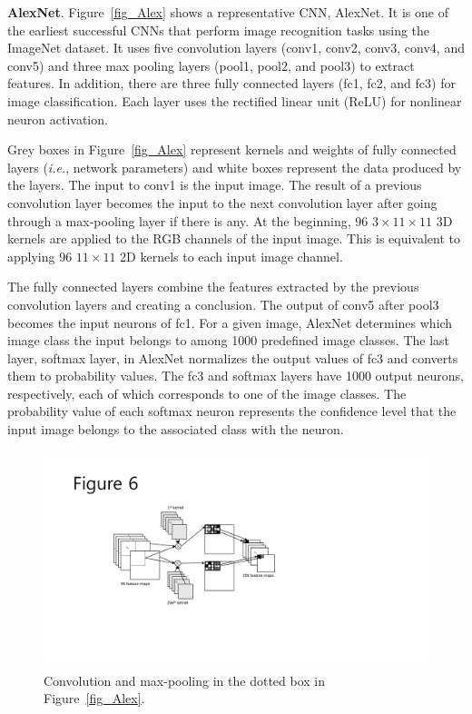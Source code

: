 {\bf AlexNet}. Figure~\ref{fig_Alex} shows a representative CNN, AlexNet\cite{krizhevsky2012imagenet}. It is one of the earliest successful CNNs that perform image recognition tasks using the ImageNet dataset\cite{DBLP:journals/corr/RussakovskyDSKSMHKKBBF14}. It uses five convolution layers (\textsf{conv1}, \textsf{conv2}, \textsf{conv3}, \textsf{conv4}, and \textsf{conv5}) and three max pooling layers (\textsf{pool1}, \textsf{pool2}, and \textsf{pool3}) to extract features. In addition, there are three fully connected layers (\textsf{fc1}, \textsf{fc2}, and \textsf{fc3}) for image classification. Each layer uses the rectified linear unit (ReLU) for nonlinear neuron activation. 

Grey boxes in Figure~\ref{fig_Alex} represent kernels and weights of fully connected layers (\textit{i.e.}, network parameters) and white boxes represent the data produced by the layers. The input to \textsf{conv1} is the input image. The result of a previous convolution layer becomes the input to the next convolution layer after going through a max-pooling layer if there is any. At the beginning, 96 $3 \times 11 \times 11$ 3D kernels are applied to the RGB channels of the input image. This is equivalent to applying 96 $11 \times 11$ 2D kernels to each input image channel. 

The fully connected layers combine the features extracted by the previous convolution layers and creating a conclusion. The output of \textsf{conv5} after \textsf{pool3} becomes the input neurons of \textsf{fc1}. For a given image, AlexNet determines which image class the input belongs to among 1000 predefined image classes. The last layer, \textsf{softmax} layer, in AlexNet normalizes the output values of \textsf{fc3} and converts them to probability values. The \textsf{fc3} and \textsf{softmax} layers have 1000 output neurons, respectively, each of which corresponds to one of the image classes. The probability value of each \textsf{softmax} neuron represents the confidence level that the input image belongs to the associated class with the neuron.

\begin{figure}[htbp]
  \centering
  \includegraphics[width=\linewidth]{./figures/convolution}
  \caption{Convolution and max-pooling in the dotted box in Figure~\ref{fig_Alex}.}
  \label{fig_convolution}
\end{figure}

